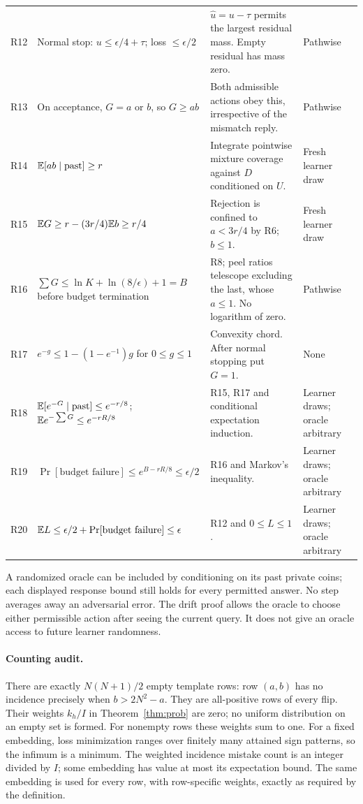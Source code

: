 \begin{longtable}{@{}p{.6cm}p{6.2cm}p{4.9cm}>{\raggedright\arraybackslash}p{2.4cm}@{}}
R12 & Normal stop: $u\le\epsilon/4+\tau$; loss $\le\epsilon/2$ & $\widehat u=u-\tau$ permits the largest residual mass. Empty residual has mass zero. & Pathwise\\
R13 & On acceptance, $G=a$ or $b$, so $G\ge ab$ & Both admissible actions obey this, irrespective of the mismatch reply. & Pathwise\\
R14 & $\mathbb E[ab\mid\text{past}]\ge r$ & Integrate pointwise mixture coverage against $D$ conditioned on $U$. & Fresh learner draw\\
R15 & $\mathbb E G\ge r-(3r/4)\mathbb E b\ge r/4$ & Rejection is confined to $a<3r/4$ by R6; $b\le1$. & Fresh learner draw\\
R16 & $\sum G\le\ln K+\ln(8/\epsilon)+1=B$ before budget termination & R8; peel ratios telescope excluding the last, whose $a\le1$. No logarithm of zero. & Pathwise\\
R17 & $e^{-g}\le1-(1-e^{-1})g$ for $0\le g\le1$ & Convexity chord. After normal stopping put $G=1$. & None\\
R18 & $\mathbb E[e^{-G}\mid\text{past}]\le e^{-r/8}$; $\mathbb E e^{-\sum G}\le e^{-rR/8}$ & R15, R17 and conditional expectation induction. & Learner draws; oracle arbitrary\\
R19 & $\Pr[\text{budget failure}]\le e^{B-rR/8}\le\epsilon/2$ & R16 and Markov's inequality. & Learner draws; oracle arbitrary\\
R20 & $\mathbb E L\le\epsilon/2+\Pr[\text{budget failure}]\le\epsilon$ & R12 and $0\le L\le1$. & Learner draws; oracle arbitrary\\
\bottomrule
\end{longtable}
\normalsize

A randomized oracle can be included by conditioning on its past private coins; each displayed response bound still holds for every permitted answer. No step averages away an adversarial error. The drift proof allows the oracle to choose either permissible action after seeing the current query. It does not give an oracle access to future learner randomness.

\paragraph{Counting audit.}
There are exactly $N(N+1)/2$ empty template rows: row $(a,b)$ has no incidence precisely when $b>2N^2-a$. They are all-positive rows of every flip. Their weights $k_h/I$ in Theorem~\ref{thm:prob} are zero; no uniform distribution on an empty set is formed. For nonempty rows these weights sum to one. For a fixed embedding, loss minimization ranges over finitely many attained sign patterns, so the infimum is a minimum. The weighted incidence mistake count is an integer divided by $I$; some embedding has value at most its expectation bound. The same embedding is used for every row, with row-specific weights, exactly as required by the definition.

